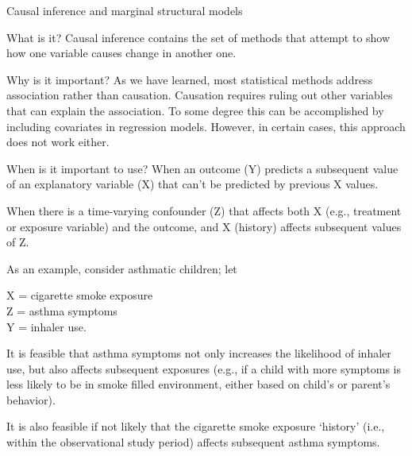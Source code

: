 \documentclass[
  9pt,
  ignorenonframetext,
]{beamer}
\begin{document}
\begin{frame}{Causal inference and marginal structural models}
\protect\hypertarget{causal-inference-and-marginal-structural-models-1}{}
\begin{block}{What is it?}
\protect\hypertarget{what-is-it}{}
Causal inference contains the set of methods that attempt to show how
one variable causes change in another one.
\end{block}

\begin{block}{Why is it important?}
\protect\hypertarget{why-is-it-important}{}
As we have learned, most statistical methods address association rather
than causation. Causation requires ruling out other variables that can
explain the association. To some degree this can be accomplished by
including covariates in regression models. However, in certain cases,
this approach does not work either.
\end{block}

\begin{block}{When is it important to use?}
\protect\hypertarget{when-is-it-important-to-use}{}
When an outcome (Y) predicts a subsequent value of an explanatory
variable (X) that can't be predicted by previous X values.

When there is a time-varying confounder (Z) that affects both X (e.g.,
treatment or exposure variable) and the outcome, and X (history) affects
subsequent values of Z.
\end{block}
\end{frame}

\begin{frame}{}
\protect\hypertarget{section-1}{}
As an example, consider asthmatic children; let

X = cigarette smoke exposure\\
Z = asthma symptoms\\
Y = inhaler use.

It is feasible that asthma symptoms not only increases the likelihood of
inhaler use, but also affects subsequent exposures (e.g., if a child
with more symptoms is less likely to be in smoke filled environment,
either based on child's or parent's behavior).

It is also feasible if not likely that the cigarette smoke exposure
`history' (i.e., within the observational study period) affects
subsequent asthma symptoms.
\end{frame}
\end{document}
